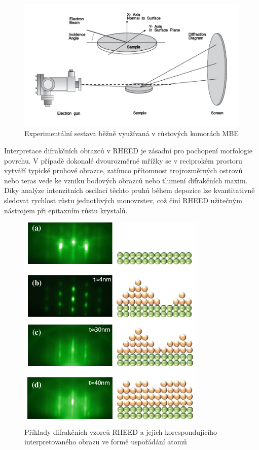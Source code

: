 \documentclass[a4paper,11pt]{article}
\begin{document}
\begin{figure}[H]
	\centering
	\includegraphics[width=1\textwidth]{images/setup1.png}
	\caption{Experimentální sestava běžně využívaná v růstových komorách MBE}
\end{figure}

Interpretace difrakčních obrazců v RHEED je zásadní pro pochopení morfologie povrchu. V případě dokonalé dvourozměrné mřížky se v reciprokém prostoru vytváří typické pruhové obrazce, zatímco přítomnost trojrozměrných ostrovů nebo teras vede ke vzniku bodových obrazců nebo tlumení difrakčních maxim. Díky analýze intenzitních oscilací těchto pruhů během depozice lze kvantitativně sledovat rychlost růstu jednotlivých monovrstev, což činí RHEED užitečným nástrojem při epitaxním růstu krystalů.\\

\begin{figure}[H]
	\centering
	\includegraphics[width=0.8\textwidth]{images/interpretation.png}
	\caption{Příklady difrakčních vzorců RHEED a jejich korespondujícího interpretovaného obrazu ve formě uspořádání atomů}
\end{figure}
\end{document}
